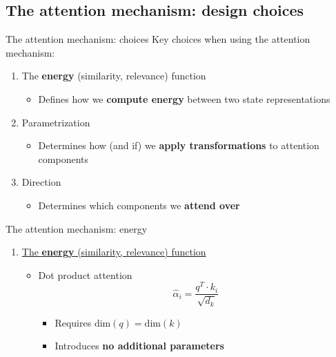 \documentclass[12pt,aspectratio=169,handout]{beamer}
\begin{document}
\subsection{The attention mechanism: design choices}

\begin{frame}{The attention mechanism: choices}
	Key choices when using the attention mechanism:
	\begin{enumerate}
		\item The \textbf{energy} (similarity, relevance) function
		\begin{itemize}
			\item Defines how we \textbf{compute energy} between two state representations
		\end{itemize}

		\item Parametrization
		
		\begin{itemize}
			\item Determines how (and if) we \textbf{apply transformations} to attention components
		\end{itemize}
		
		\item Direction
		
		\begin{itemize}
			\item Determines which components we \textbf{attend over}
		\end{itemize}

	\end{enumerate}
\end{frame}

\begin{frame}{The attention mechanism: energy}
	\begin{enumerate}
		\item \underline{The \textbf{energy} (similarity, relevance) function}
		\pause
		\begin{itemize}
			\item Dot product attention
				$$
					\hat{\alpha}_i = \frac{q^T \cdot k_i}{\sqrt{d_k} }
				$$
			\pause
			\begin{itemize}
				\item Requires $\text{dim}(q) = \text{dim}(k)$
				\item Introduces \textbf{no additional parameters}
			\end{itemize}

		\end{itemize}
	\end{enumerate}
\end{frame}
\end{document}
